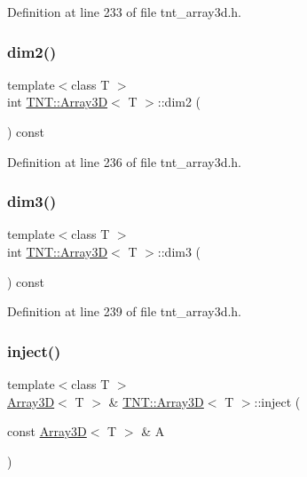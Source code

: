 Definition at line 233 of file tnt\+\_\+array3d.\+h.

\mbox{\label{classTNT_1_1Array3D_aa63126693cd5679e950430a48d530f4b}} 
\subsubsection{\texorpdfstring{dim2()}{dim2()}}
{\footnotesize\ttfamily template$<$class T $>$ \\
int \hyperlink{classTNT_1_1Array3D}{T\+N\+T\+::\+Array3D}$<$ T $>$\+::dim2 (\begin{DoxyParamCaption}{ }\end{DoxyParamCaption}) const\hspace{0.3cm}{\ttfamily [inline]}}



Definition at line 236 of file tnt\+\_\+array3d.\+h.

\mbox{\label{classTNT_1_1Array3D_a892ab246eb797350f54e9d4a7a9ab4ce}} 
\subsubsection{\texorpdfstring{dim3()}{dim3()}}
{\footnotesize\ttfamily template$<$class T $>$ \\
int \hyperlink{classTNT_1_1Array3D}{T\+N\+T\+::\+Array3D}$<$ T $>$\+::dim3 (\begin{DoxyParamCaption}{ }\end{DoxyParamCaption}) const\hspace{0.3cm}{\ttfamily [inline]}}



Definition at line 239 of file tnt\+\_\+array3d.\+h.

\mbox{\label{classTNT_1_1Array3D_ac9004a4cc385cbfc0d3b742efd605e1c}} 
\subsubsection{\texorpdfstring{inject()}{inject()}}
{\footnotesize\ttfamily template$<$class T $>$ \\
\hyperlink{classTNT_1_1Array3D}{Array3D}$<$ T $>$ \& \hyperlink{classTNT_1_1Array3D}{T\+N\+T\+::\+Array3D}$<$ T $>$\+::inject (\begin{DoxyParamCaption}\item[{const \hyperlink{classTNT_1_1Array3D}{Array3D}$<$ T $>$ \&}]{A }\end{DoxyParamCaption})}



